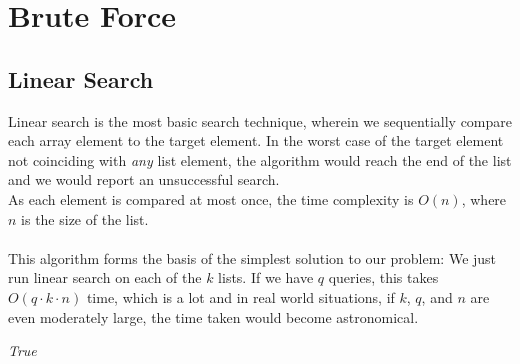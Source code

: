 \documentclass[11pt]{article}
\begin{document}
\section{Brute Force}
\subsection{Linear Search}

Linear search is the most basic search technique, wherein we sequentially compare each array element to the target element. In the worst case of the target element not coinciding with \textit{any} list element, the algorithm would reach the end of the list and we would report an unsuccessful search. \\
As each element is compared at most once, the time complexity is $O(n)$, where $n$ is the size of the list. \\ \\

This algorithm forms the basis of the simplest solution to our problem: We just run linear search on each of the $k$ lists. If we have $q$ queries, this takes $O(q \cdot k \cdot n)$ time, which is a lot and in real world situations, if $k$, $q$, and $n$ are even moderately large, the time taken would become astronomical. \\ 

\begin{tcolorbox}[blanker,width=(\linewidth-3.5cm)]
\begin{algorithm}[H]
    \SetAlgoLined
    
    
    {
        {
                {\KwRet \textit{True}\;}
        }
    }
    
    
    

\end{algorithm}
\end{tcolorbox}
\end{document}
